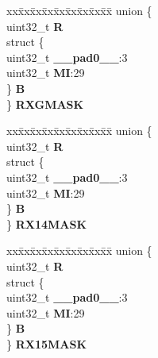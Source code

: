 \begin{DoxyCompactItemize}
\begin{tabbing}
\end{tabbing}\item 
\mbox{\label{structFLEXCAN2__tag_a522770bd51645dc2da26c3be09a378c8}} 
\begin{tabbing}
xx\=xx\=xx\=xx\=xx\=xx\=xx\=xx\=xx\=\kill
union \{\\
\>uint32\_t {\bfseries R}\\
\>struct \{\\
\>\>uint32\_t {\bfseries \_\_pad0\_\_}:3\\
\>\>uint32\_t {\bfseries MI}:29\\
\>\} {\bfseries B}\\
\} {\bfseries RXGMASK}\\

\end{tabbing}\item 
\mbox{\label{structFLEXCAN2__tag_a38f3ce9d2efb0719dc8a9320459cdeb4}} 
\begin{tabbing}
xx\=xx\=xx\=xx\=xx\=xx\=xx\=xx\=xx\=\kill
union \{\\
\>uint32\_t {\bfseries R}\\
\>struct \{\\
\>\>uint32\_t {\bfseries \_\_pad0\_\_}:3\\
\>\>uint32\_t {\bfseries MI}:29\\
\>\} {\bfseries B}\\
\} {\bfseries RX14MASK}\\

\end{tabbing}\item 
\mbox{\label{structFLEXCAN2__tag_af307e276dd00188c604c89c8952a1aee}} 
\begin{tabbing}
xx\=xx\=xx\=xx\=xx\=xx\=xx\=xx\=xx\=\kill
union \{\\
\>uint32\_t {\bfseries R}\\
\>struct \{\\
\>\>uint32\_t {\bfseries \_\_pad0\_\_}:3\\
\>\>uint32\_t {\bfseries MI}:29\\
\>\} {\bfseries B}\\
\} {\bfseries RX15MASK}\\


\end{tabbing}
\end{DoxyCompactItemize}
